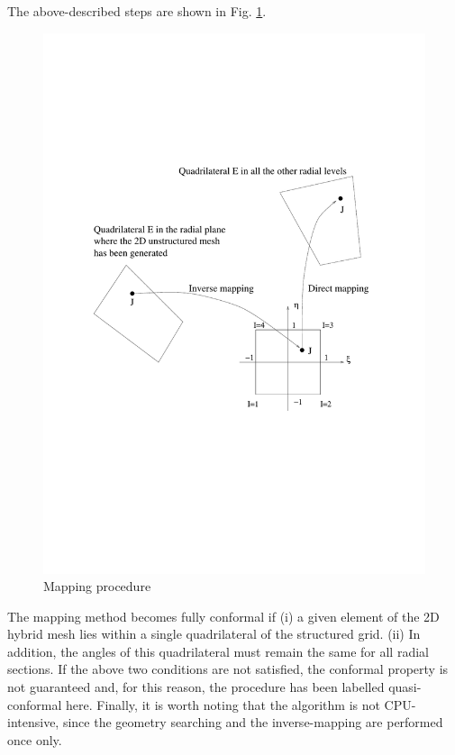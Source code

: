  The above-described steps are shown in Fig. \ref{mapping.fig}.
%
\begin{figure}[ht]
   \centerline{\includegraphics[width=120mm,clip=t]{CHAP_MESH/FIGURE/mapping.pdf}}
   \caption{Mapping procedure}
   \label{mapping.fig}
\end{figure}
%
 The mapping method becomes fully conformal if (i) a given element of the 2D
 hybrid mesh lies within a single quadrilateral of the structured
 grid. (ii) In addition, the angles of this quadrilateral must remain the
 same for all radial sections.
 If the above two conditions are not
 satisfied, the conformal property is not guaranteed and, for this reason,
 the procedure has been labelled quasi-conformal here.
 Finally, it is worth noting that the algorithm is not CPU-intensive,
 since the geometry searching and
 the inverse-mapping are performed once only.

